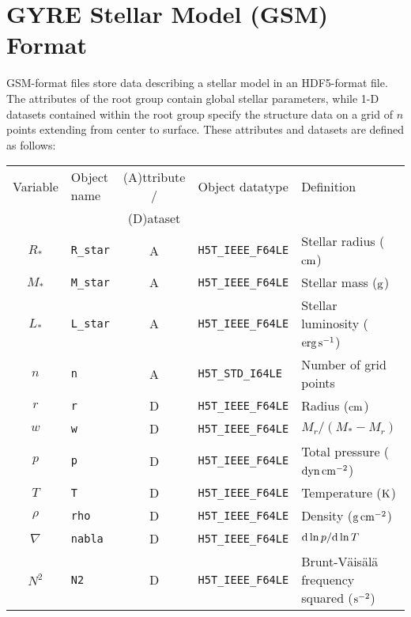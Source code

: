 \documentclass{article}
\newcommand{\diff}{\ensuremath{{\rm d}}}
\newcommand{\Rstar}{\ensuremath{R_{\ast}}}
\newcommand{\Mstar}{\ensuremath{M_{\ast}}}
\newcommand{\Lstar}{\ensuremath{L_{\ast}}}
\newcommand{\cm}{\ensuremath{{\rm cm}}}
\newcommand{\gram}{\ensuremath{{\rm g}}}
\newcommand{\second}{\ensuremath{{\rm s}}}
\newcommand{\dyne}{\ensuremath{{\rm dyn}}}
\newcommand{\erg}{\ensuremath{{\rm erg}}}
\newcommand{\kelvin}{\ensuremath{{\rm K}}}
\begin{document}
\section*{GYRE Stellar Model (GSM) Format}

GSM-format files store data describing a stellar model in an
HDF5-format file. The attributes of the root group contain global
stellar parameters, while 1-D datasets contained within the root group
specify the structure data on a grid of $n$ points extending from
center to surface. These attributes and datasets are defined as
follows:

\begin{table}[h!]
\begin{tabular}{|c|l|c|l|l|} \hline
Variable & Object name & (A)ttribute / & Object datatype & Definition \\
         &             & (D)ataset     &                 &            \\ \hline
\Rstar            & \texttt{R\_star}      & A & \texttt{H5T\_IEEE\_F64LE} & Stellar radius ($\cm$) \\
\Mstar            & \texttt{M\_star}      & A & \texttt{H5T\_IEEE\_F64LE} & Stellar mass ($\gram$) \\
\Lstar            & \texttt{L\_star}      & A & \texttt{H5T\_IEEE\_F64LE} & Stellar luminosity ($\erg\,\second^{-1}$) \\
$n$               & \texttt{n}            & A &\texttt{H5T\_STD\_I64LE}  & Number of grid points \\ 
$r$               & \texttt{r}            & D & \texttt{H5T\_IEEE\_F64LE} & Radius ($\cm$) \\
$w$               & \texttt{w}            & D & \texttt{H5T\_IEEE\_F64LE} & $M_{r}/(\Mstar-M_{r})$ \\
$p$               & \texttt{p}            & D & \texttt{H5T\_IEEE\_F64LE} & Total pressure ($\dyne\,\cm^{-2}$) \\
$T$               & \texttt{T}            & D & \texttt{H5T\_IEEE\_F64LE} & Temperature ($\kelvin$) \\
$\rho$            & \texttt{rho}          & D & \texttt{H5T\_IEEE\_F64LE} & Density ($\gram\,\cm^{-2}$) \\
$\nabla$          & \texttt{nabla}        & D & \texttt{H5T\_IEEE\_F64LE} & $\diff \ln p/\diff \ln T$ \\
$N^{2}$           & \texttt{N2}           & D & \texttt{H5T\_IEEE\_F64LE} & Brunt-V\"ais\"al\"a frequency squared ($\second^{-2}$) \\

\end{tabular}
\end{table}
\end{document}
